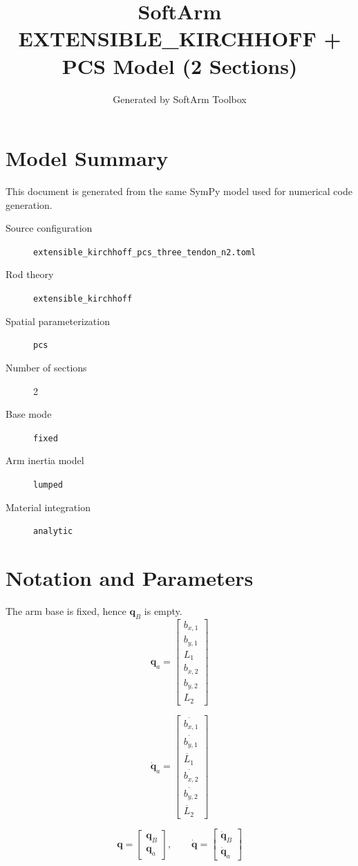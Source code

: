 \documentclass[11pt]{article}
\title{SoftArm EXTENSIBLE\_KIRCHHOFF + PCS Model (2 Sections)}
\author{Generated by SoftArm Toolbox}
\date{}
\begin{document}
\maketitle

\section{Model Summary}
This document is generated from the same SymPy model used for numerical code generation.
\begin{description}
\item[Source configuration] \texttt{extensible\_kirchhoff\_pcs\_three\_tendon\_n2.toml}
\item[Rod theory] \texttt{extensible\_kirchhoff}
\item[Spatial parameterization] \texttt{pcs}
\item[Number of sections] 2
\item[Base mode] \texttt{fixed}
\item[Arm inertia model] \texttt{lumped}
\item[Material integration] \texttt{analytic}
\end{description}

\section{Notation and Parameters}
The arm base is fixed, hence $\boldsymbol q_B$ is empty.
\begin{equation}
\boldsymbol q_a=\begin{bmatrix}b_{x,1}\\b_{y,1}\\L_{1}\\b_{x,2}\\b_{y,2}\\L_{2}\end{bmatrix}
\end{equation}

\begin{equation}
\dot{\boldsymbol q}_a=\begin{bmatrix}\dot{b_{x,1}}\\\dot{b_{y,1}}\\\dot{L_{1}}\\\dot{b_{x,2}}\\\dot{b_{y,2}}\\\dot{L_{2}}\end{bmatrix}
\end{equation}

\begin{equation}
\boldsymbol q=\begin{bmatrix}\boldsymbol q_B\\\boldsymbol q_a\end{bmatrix},\qquad \dot{\boldsymbol q}=\begin{bmatrix}\dot{\boldsymbol q}_B\\\dot{\boldsymbol q}_a\end{bmatrix}
\end{equation}
\end{document}
